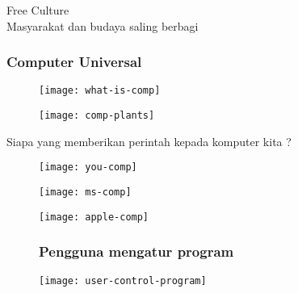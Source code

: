 \documentclass[notes]{beamer}       %
\begin{document}
\begin{frame}
  \begin{center}
    \Huge Free Culture \\
    \small Masyarakat dan budaya saling berbagi
  \end{center}
\end{frame}


\begin{frame}
  \frametitle{Computer Universal}
  \begin{figure}
    \centering
    \texttt{[image: what-is-comp]}
  \end{figure}
\end{frame}

\begin{frame}
  \begin{figure}
    \centering
    \texttt{[image: comp-plants]}
  \end{figure}
\end{frame}

\begin{frame}
  \begin{center}
    \Huge Siapa yang memberikan perintah kepada komputer kita ?
  \end{center}
\end{frame}


\begin{frame}
  \begin{figure}
    \centering
    \texttt{[image: you-comp]}
  \end{figure}
\end{frame}

\begin{frame}
  \begin{figure}
    \centering
    \texttt{[image: ms-comp]}
  \end{figure}
\end{frame}

\begin{frame}
  \begin{figure}
    \centering
    \texttt{[image: apple-comp]}
  \end{figure}
\end{frame}

\begin{frame}
  \begin{figure}
    \frametitle{Pengguna mengatur program}
    \centering
    \texttt{[image: user-control-program]}
  \end{figure}
\end{frame}
\end{document}
